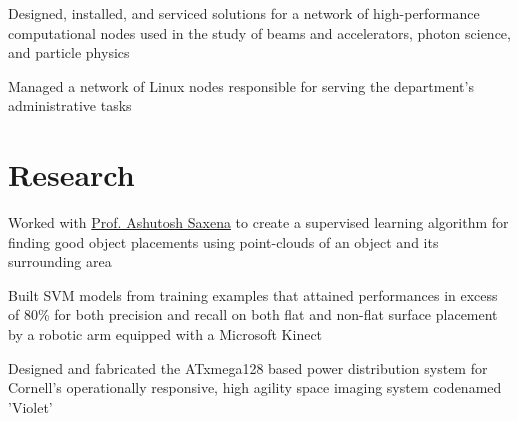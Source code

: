 \documentclass[]{deedy-resume-openfont}
\begin{document}
    \begin{tightemize}
        \item
            Designed, installed, and serviced solutions for a network of
            high-performance computational nodes used in the study of beams
            and accelerators, photon science, and particle physics
        \item
            Managed a network of Linux nodes responsible for serving the
            department's administrative tasks
    \end{tightemize}
\sectionsep

\section{Research}
            \begin{tightemize}
                \item
                    Worked with \href{http://www.cs.cornell.edu/~asaxena/}{
                    Prof. Ashutosh Saxena} to create a supervised learning
                    algorithm for finding good object placements using
                    point-clouds of an object and its surrounding area
                \item
                    Built SVM models from training examples that attained
                    performances in excess of 80\% for both precision and
                    recall on both flat and non-flat surface placement by
                    a robotic arm
                    equipped with a Microsoft Kinect
            \end{tightemize}
    \sectionsep

            \begin{tightemize}
                \item
                    Designed and fabricated the ATxmega128 based power
                    distribution system for Cornell’s operationally responsive,
                    high agility space imaging system codenamed 'Violet'
            \end{tightemize}
    \sectionsep
\end{document}
